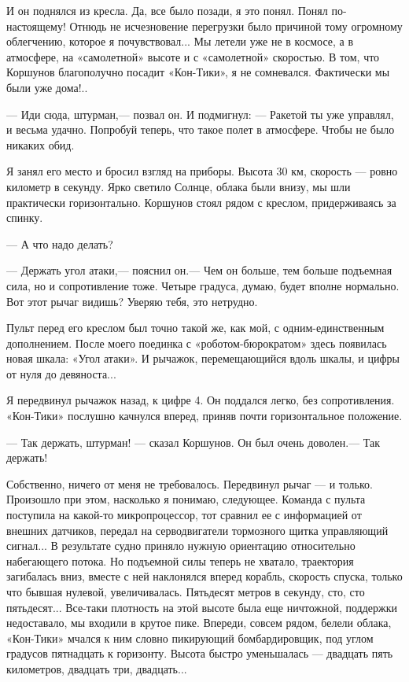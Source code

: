 \documentclass[11pt,a4paper,oneside]{article}
\begin{document}
И он поднялся из кресла. Да, все было позади, я это понял. Понял по- настоящему! Отнюдь не исчезновение перегрузки было причиной тому огромному облегчению, которое я почувствовал... Мы летели уже не в космосе, а в атмосфере, на «самолетной» высоте и с «самолетной» скоростью. В том, что Коршунов благополучно посадит «Кон-Тики», я не сомневался. Фактически мы были уже дома!..

— Иди сюда, штурман,— позвал он. И подмигнул: — Ракетой ты уже управлял, и весьма удачно. Попробуй теперь, что такое полет в атмосфере. Чтобы не было никаких обид.

Я занял его место и бросил взгляд на приборы. Высота 30 км, скорость — ровно километр в секунду. Ярко светило Солнце, облака были внизу, мы шли практически горизонтально. Коршунов стоял рядом с креслом, придерживаясь за спинку.

— А что надо делать?

— Держать угол атаки,— пояснил он.— Чем он больше, тем больше подъемная сила, но и сопротивление тоже. Четыре градуса, думаю, будет вполне нормально. Вот этот рычаг видишь? Уверяю тебя, это нетрудно.

Пульт перед его креслом был точно такой же, как мой, с одним-единственным дополнением. После моего поединка с «роботом-бюрократом» здесь появилась новая шкала: «Угол атаки». И рычажок, перемещающийся вдоль шкалы, и цифры от нуля до девяноста...

Я передвинул рычажок назад, к цифре 4. Он поддался легко, без сопротивления. «Кон-Тики» послушно качнулся вперед, приняв почти горизонтальное положение.

— Так держать, штурман! — сказал Коршунов. Он был очень доволен.— Так держать!

Собственно, ничего от меня не требовалось. Передвинул рычаг — и только. Произошло при этом, насколько я понимаю, следующее. Команда с пульта поступила на какой-то микропроцессор, тот сравнил ее с информацией от внешних датчиков, передал на серводвигатели тормозного щитка управляющий сигнал... В результате судно приняло нужную ориентацию относительно набегающего потока. Но подъемной силы теперь не хватало, траектория загибалась вниз, вместе с ней наклонялся вперед корабль, скорость спуска, только что бывшая нулевой, увеличивалась. Пятьдесят метров в секунду, сто, сто пятьдесят... Все-таки плотность на этой высоте была еще ничтожной, поддержки недоставало, мы входили в крутое пике. Впереди, совсем рядом, белели облака, «Кон-Тики» мчался к ним словно пикирующий бомбардировщик, под углом градусов пятнадцать к горизонту. Высота быстро уменьшалась — двадцать пять километров, двадцать три, двадцать...
\end{document}
